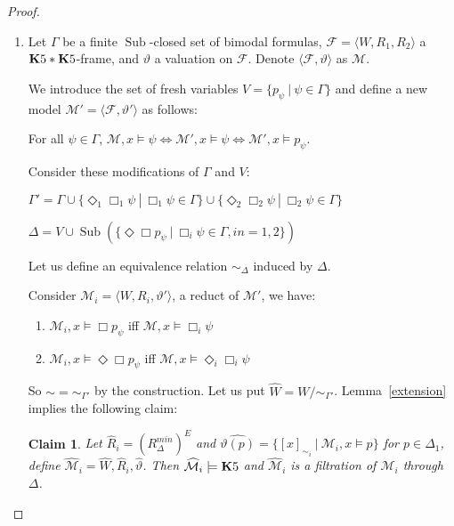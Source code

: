 \documentclass[a4paper]{article}
\theoremstyle{defin}
\theoremstyle{theorem}
\theoremstyle{prop}
\theoremstyle{lemma}
\theoremstyle{fact}
\theoremstyle{ex}
\theoremstyle{col}
\theoremstyle{claim}
\newtheorem{claim}{Claim}
\begin{document}
\begin{proof}
$ $

  \begin{enumerate}
  \item Let $\Gamma$ be a finite $\operatorname{Sub}$-closed set of bimodal formulas,
  $\mathcal{F} = \langle W, R_1, R_2 \rangle$ a ${\bf K}5 * {\bf K}5$-frame, and $\vartheta$ a valuation on $\mathcal{F}$. Denote $\langle \mathcal{F}, \vartheta \rangle$ as $\mathcal{M}$.

  We introduce the set of fresh variables $V = \{ p_{\psi} \: | \: \psi \in \Gamma \}$ and define a new model $\mathcal{M}' = \langle \mathcal{F}, \vartheta' \rangle$ as follows:
  \begin{center}
    For all $\psi \in \Gamma$, $\mathcal{M}, x \models \psi \Leftrightarrow \mathcal{M}', x \models \psi \Leftrightarrow \mathcal{M}', x \models p_{\psi}$.
  \end{center}

  Consider these modifications of $\Gamma$ and $V$:

  \begin{center}
    $\Gamma' = \Gamma \cup \{ \Diamond_1 \Box_1 \psi \: | \: \Box_1 \psi \in \Gamma \} \cup \{ \Diamond_2 \Box_2 \psi \: | \: \Box_2 \psi \in \Gamma \}$

    $\Delta = V \cup \operatorname{Sub}(\{ \Diamond \Box p_{\psi} \: | \: \Box_i \psi \in \Gamma, i n= 1,2 \})$
  \end{center}
  Let us define an equivalence relation $\sim_{\Delta}$ induced by $\Delta$.

  Consider $\mathcal{M}_i = \langle W, R_i, \vartheta' \rangle$, a reduct of $\mathcal{M}'$, we have:
  \begin{enumerate}
    \item $\mathcal{M}_i, x \models \Box p_{\psi}$ iff $\mathcal{M}, x \models \Box_i \psi$
    \item $\mathcal{M}_i, x \models \Diamond \Box p_{\psi}$ iff $\mathcal{M}, x \models \Diamond_i \Box_i \psi$
  \end{enumerate}
  So $\sim = \sim_{\Gamma'}$ by the construction. Let us put $\widehat{W} = W / \sim_{\Gamma'}$. Lemma~\ref{extension} implies the following claim:

  \begin{claim}
    Let $\widehat{R}_i = (R^{min}_{\Delta})^{E}$ and
    $\widehat{\vartheta(p)} = \{ [x]_{\sim_i} \: | \: \mathcal{M}_i, x \models p \}$ for $p \in \Delta_1$, define $\widehat{\mathcal{M}}_i = \widehat{W}, \widehat{R}_i, \widehat{\vartheta}$. Then $\widehat{\mathcal{M}}_i \models {\bf K}5$ and $\widehat{\mathcal{M}}_i$ is a filtration of $\mathcal{M}_i$ through $\Delta$.
  \end{claim}


\end{enumerate}
\end{proof}
\end{document}
